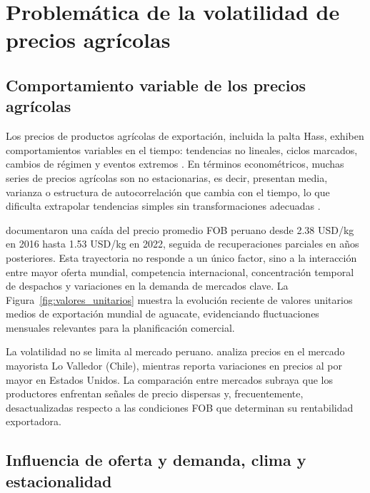 \section{Problem\'atica de la volatilidad de precios agr\'icolas}

\subsection{Comportamiento variable de los precios agr\'icolas}

Los precios de productos agr\'icolas de exportaci\'on, incluida la palta Hass, exhiben comportamientos variables en el tiempo: tendencias no lineales, ciclos marcados, cambios de r\'egimen y eventos extremos \citep{Velasquez2025, Zhang2025}. En t\'erminos econom\'etricos, muchas series de precios agr\'icolas son no estacionarias, es decir, presentan media, varianza o estructura de autocorrelaci\'on que cambia con el tiempo, lo que dificulta extrapolar tendencias simples sin transformaciones adecuadas \citep{Xia2024}.

\citet{VitteryFlores2023} documentaron una ca\'ida del precio promedio FOB peruano desde 2.38 USD/kg en 2016 hasta 1.53 USD/kg en 2022, seguida de recuperaciones parciales en a\~nos posteriores. Esta trayectoria no responde a un \'unico factor, sino a la interacci\'on entre mayor oferta mundial, competencia internacional, concentraci\'on temporal de despachos y variaciones en la demanda de mercados clave. La Figura~\ref{fig:valores_unitarios} muestra la evoluci\'on reciente de valores unitarios medios de exportaci\'on mundial de aguacate, evidenciando fluctuaciones mensuales relevantes para la planificaci\'on comercial.


La volatilidad no se limita al mercado peruano. \citet{Trincado2022} analiza precios en el mercado mayorista Lo Valledor (Chile), mientras \citet{FAO2026} reporta variaciones en precios al por mayor en Estados Unidos. La comparaci\'on entre mercados subraya que los productores enfrentan se\~nales de precio dispersas y, frecuentemente, desactualizadas respecto a las condiciones FOB que determinan su rentabilidad exportadora.

\subsection{Influencia de oferta y demanda, clima y estacionalidad}

